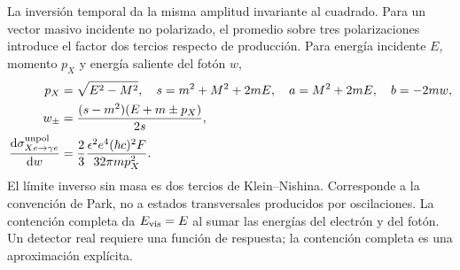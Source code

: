 \section{}
{La inversión temporal da la misma amplitud invariante al cuadrado. Para un vector masivo incidente no polarizado, el promedio sobre tres polarizaciones introduce el factor dos tercios respecto de producción. Para energía incidente $E$, momento $p_X$ y energía saliente del fotón $w$,}
\begin{align}
p_X&=\sqrt{E^2-M^2},\quad s=m^2+M^2+2mE,\quad a=M^2+2mE,\quad b=-2mw,\\
w_\pm&=\frac{(s-m^2)(E+m\pm p_X)}{2s},\\
\frac{\mathrm{d}\sigma_{Xe\to\gamma e}^{\rm unpol}}{\mathrm{d} w}&=\frac23\frac{\epsilon^2e^4(\hbar c)^2 F}{32\pi m p_X^2}.
\end{align}
{El límite inverso sin masa es dos tercios de Klein--Nishina. Corresponde a la convención de Park, no a estados transversales producidos por oscilaciones. La contención completa da $E_{\rm vis}=E$ al sumar las energías del electrón y del fotón. Un detector real requiere una función de respuesta; la contención completa es una aproximación explícita.}
